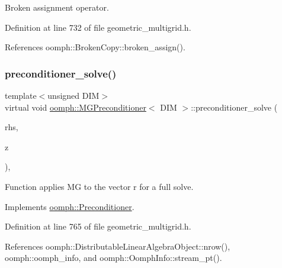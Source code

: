 Broken assignment operator. 



Definition at line 732 of file geometric\+\_\+multigrid.\+h.



References oomph\+::\+Broken\+Copy\+::broken\+\_\+assign().

\mbox{\label{classoomph_1_1MGPreconditioner_afa4c545cc49e9712e4d68f5c0275aefe}} 
\subsubsection{\texorpdfstring{preconditioner\+\_\+solve()}{preconditioner\_solve()}}
{\footnotesize\ttfamily template$<$unsigned D\+IM$>$ \\
virtual void \hyperlink{classoomph_1_1MGPreconditioner}{oomph\+::\+M\+G\+Preconditioner}$<$ D\+IM $>$\+::preconditioner\+\_\+solve (\begin{DoxyParamCaption}\item[{const \hyperlink{classoomph_1_1DoubleVector}{Double\+Vector} \&}]{rhs,  }\item[{\hyperlink{classoomph_1_1DoubleVector}{Double\+Vector} \&}]{z }\end{DoxyParamCaption})\hspace{0.3cm}{\ttfamily [inline]}, {\ttfamily [virtual]}}



Function applies MG to the vector r for a full solve. 



Implements \hyperlink{classoomph_1_1Preconditioner_ace1199369e4465cd2b9a34884bb64ec8}{oomph\+::\+Preconditioner}.



Definition at line 765 of file geometric\+\_\+multigrid.\+h.



References oomph\+::\+Distributable\+Linear\+Algebra\+Object\+::nrow(), oomph\+::oomph\+\_\+info, and oomph\+::\+Oomph\+Info\+::stream\+\_\+pt().

\mbox{\label{classoomph_1_1MGPreconditioner_a476a8e769a62e52e1db6c618ede7408d}} 
